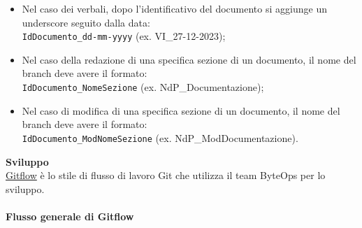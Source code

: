 \begin{itemize}
    \item Nel caso dei verbali, dopo l'identificativo del documento si aggiunge un underscore seguito dalla data: \\
    \texttt{IdDocumento\_dd-mm-yyyy} (ex. VI\_27-12-2023);
    \item Nel caso della redazione di una specifica sezione di un documento, il nome del branch deve avere il formato: \\
    \texttt{IdDocumento\_NomeSezione} (ex. NdP\_Documentazione);
    \item Nel caso di modifica di una specifica sezione di un documento, il nome del branch deve avere il formato: \\
    \texttt{IdDocumento\_ModNomeSezione} (ex. NdP\_ModDocumentazione).
\end{itemize}

\textbf{Sviluppo} \\
\href{https://www.atlassian.com/it/git/tutorials/comparing-workflows/gitflow-workflow}{Gitflow} è lo stile di flusso di lavoro Git che utilizza il team ByteOps per lo sviluppo.

\paragraph*{Flusso generale di Gitflow}

